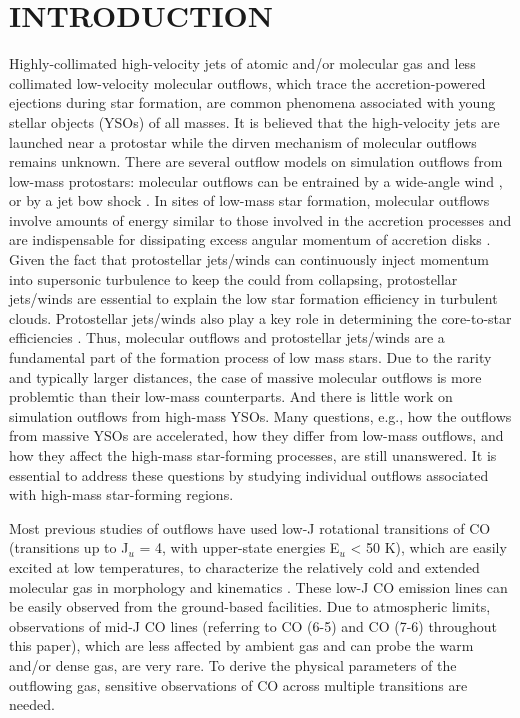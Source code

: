 \section{INTRODUCTION}
Highly-collimated high-velocity jets of atomic and/or molecular gas and less collimated low-velocity molecular outflows, which trace the accretion-powered ejections during star formation, are common phenomena associated with young stellar objects (YSOs) of all masses\citep{ 1985ARA&A..23..267L,1993prpl.conf..603F, 2001ApJ...552L.167Z,2002A&A...383..892B, 2004A&A...426..503W, 2006A&A...453..785F, 2007prpl.conf..245A, 2015MNRAS.453..645M}. It is believed that the high-velocity jets are launched near a protostar while the dirven mechanism of molecular outflows remains unknown. There are several outflow models on simulation outflows from low-mass protostars: molecular outflows can be entrained by a wide-angle wind \citep{1991ApJ...370L..31S,1996ApJ...472..211L, 2001ApJ...557..429L}, or by a jet bow shock \citep{ 1993A&A...278..267R, 1993ApJ...414..230M, 2001ApJ...557..429L}. In sites of low-mass star formation, molecular outflows involve amounts of energy similar to those involved in the accretion processes and are indispensable for dissipating excess angular momentum of accretion disks \citep{1987ARA&A..25...23S, 1996ARA&A..34..111B}. Given the fact that protostellar jets/winds can continuously inject momentum into supersonic turbulence to keep the could from collapsing, protostellar jets/winds are essential to explain the low star formation efficiency in turbulent clouds. Protostellar jets/winds also play a key role in determining the core-to-star efficiencies \citep{2014prpl.conf..451F}. Thus, molecular outflows and protostellar jets/winds are a fundamental part of the formation process of low mass stars. Due to the rarity and typically larger distances, the case of massive molecular outflows is more problemtic than their low-mass counterparts. And there is little work on simulation outflows from high-mass YSOs. Many questions, e.g., how the outflows from massive YSOs are accelerated, how they differ from low-mass outflows, and how they affect the high-mass star-forming processes, are still unanswered. It is essential to address these questions by studying individual outflows associated with high-mass star-forming regions. 

Most previous studies of outflows have used low-J rotational transitions of CO (transitions up to J$_u$ = 4, with upper-state energies E$_u$ < 50 K), which are easily excited at low temperatures, to characterize the relatively cold and extended molecular gas in morphology and kinematics \citep{1998ApJ...507..861S, 2004ApJ...604..258S, 2008ApJ...675..454Y, 2009ApJ...696...66Q, 2009A&A...495..169S, 2013ApJ...774...39A, 2016ApJ...832..158Z}. These low-J CO emission lines can be easily observed from the ground-based facilities. Due to atmospheric limits, observations of mid-J CO lines (referring to CO (6-5) and CO (7-6) throughout this paper), which are less affected by ambient gas and can probe the warm and/or dense gas, are very rare. To derive the physical parameters of the outflowing gas, sensitive observations of CO across multiple transitions are needed. 


